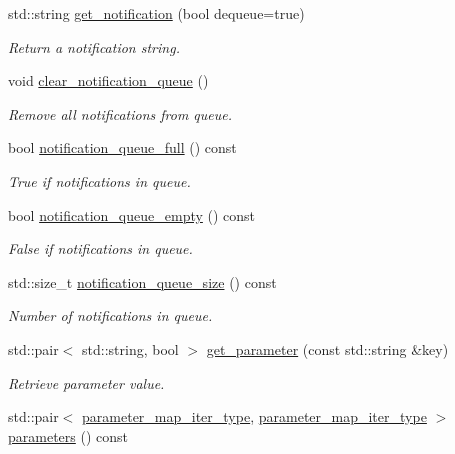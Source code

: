 \begin{DoxyCompactItemize}
std\+::string \hyperlink{classsession_ad0c8821300a53f8a953081cd01d54d72}{get\+\_\+notification} (bool dequeue=true)
\begin{DoxyCompactList}\small\item\em Return a notification string. \end{DoxyCompactList}\item 
\mbox{\label{classsession_a1140a68ffe03f01460422acfa6914dd0}} 
void \hyperlink{classsession_a1140a68ffe03f01460422acfa6914dd0}{clear\+\_\+notification\+\_\+queue} ()
\begin{DoxyCompactList}\small\item\em Remove all notifications from queue. \end{DoxyCompactList}\item 
bool \hyperlink{classsession_a2e6188e1e5d492d6fdf471f3437917d7}{notification\+\_\+queue\+\_\+full} () const
\begin{DoxyCompactList}\small\item\em True if notifications in queue. \end{DoxyCompactList}\item 
bool \hyperlink{classsession_af492668f758ee3fe77de1ec3d22397b6}{notification\+\_\+queue\+\_\+empty} () const
\begin{DoxyCompactList}\small\item\em False if notifications in queue. \end{DoxyCompactList}\item 
std\+::size\+\_\+t \hyperlink{classsession_a3faec32b930e7b8e240d69a9e967fbd7}{notification\+\_\+queue\+\_\+size} () const
\begin{DoxyCompactList}\small\item\em Number of notifications in queue. \end{DoxyCompactList}\item 
std\+::pair$<$ std\+::string, bool $>$ \hyperlink{classsession_ae5fddc8982be0e4568c7b6cf1a05fa09}{get\+\_\+parameter} (const std\+::string \&key)
\begin{DoxyCompactList}\small\item\em Retrieve parameter value. \end{DoxyCompactList}\item 
\mbox{\label{classsession_af890226c866c39ae355d91bd6f35d131}} 
std\+::pair$<$ \hyperlink{classsession_a1e824e1c18e52914acbf25408989622f}{parameter\+\_\+map\+\_\+iter\+\_\+type}, \hyperlink{classsession_a1e824e1c18e52914acbf25408989622f}{parameter\+\_\+map\+\_\+iter\+\_\+type} $>$ \hyperlink{classsession_af890226c866c39ae355d91bd6f35d131}{parameters} () const

\end{DoxyCompactItemize}
